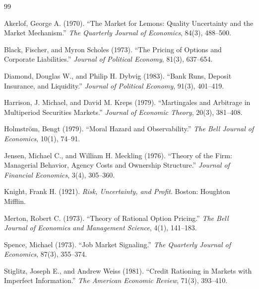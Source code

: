 \renewcommand{\bibname}{References}

\begin{thebibliography}{99}

Akerlof, George A. (1970).
``The Market for Lemons: Quality Uncertainty and the Market Mechanism.''
\emph{The Quarterly Journal of Economics}, 84(3), 488--500.

Black, Fischer, and Myron Scholes (1973).
``The Pricing of Options and Corporate Liabilities.''
\emph{Journal of Political Economy}, 81(3), 637--654.

Diamond, Douglas W., and Philip H. Dybvig (1983).
``Bank Runs, Deposit Insurance, and Liquidity.''
\emph{Journal of Political Economy}, 91(3), 401--419.

Harrison, J. Michael, and David M. Kreps (1979).
``Martingales and Arbitrage in Multiperiod Securities Markets.''
\emph{Journal of Economic Theory}, 20(3), 381--408.

Holmstr\"om, Bengt (1979).
``Moral Hazard and Observability.''
\emph{The Bell Journal of Economics}, 10(1), 74--91.

Jensen, Michael C., and William H. Meckling (1976).
``Theory of the Firm: Managerial Behavior, Agency Costs and Ownership Structure.''
\emph{Journal of Financial Economics}, 3(4), 305--360.

Knight, Frank H. (1921).
\emph{Risk, Uncertainty, and Profit}.
Boston: Houghton Mifflin.

Merton, Robert C. (1973).
``Theory of Rational Option Pricing.''
\emph{The Bell Journal of Economics and Management Science}, 4(1), 141--183.

Spence, Michael (1973).
``Job Market Signaling.''
\emph{The Quarterly Journal of Economics}, 87(3), 355--374.

Stiglitz, Joseph E., and Andrew Weiss (1981).
``Credit Rationing in Markets with Imperfect Information.''
\emph{The American Economic Review}, 71(3), 393--410.

\end{thebibliography}
